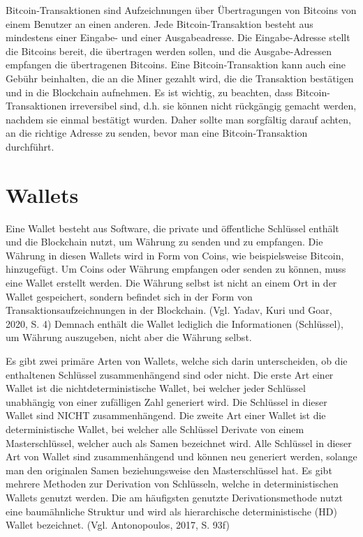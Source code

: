 Bitcoin-Transaktionen sind Aufzeichnungen über Übertragungen von Bitcoins von einem Benutzer an einen anderen. Jede
Bitcoin-Transaktion besteht aus mindestens einer Eingabe- und einer Ausgabeadresse. Die Eingabe-Adresse stellt die Bitcoins
bereit, die übertragen werden sollen, und die Ausgabe-Adressen empfangen die übertragenen Bitcoins. Eine Bitcoin-Transaktion
kann auch eine Gebühr beinhalten, die an die Miner gezahlt wird, die die Transaktion bestätigen und in die Blockchain aufnehmen.
Es ist wichtig, zu beachten, dass Bitcoin-Transaktionen irreversibel sind, d.h. sie können nicht rückgängig gemacht werden,
nachdem sie einmal bestätigt wurden. Daher sollte man sorgfältig darauf achten, an die richtige Adresse zu senden, bevor man eine
Bitcoin-Transaktion durchführt.

\section{Wallets}
Eine Wallet besteht aus Software, die private und öffentliche Schlüssel enthält und die Blockchain nutzt, um Währung zu senden
und zu empfangen. Die Währung in diesen Wallets wird in Form von Coins, wie beispielsweise Bitcoin, hinzugefügt. Um Coins oder
Währung empfangen oder senden zu können, muss eine Wallet erstellt werden. Die Währung selbst ist nicht an einem Ort in der Wallet
gespeichert, sondern befindet sich in der Form von Transaktionsaufzeichnungen in der Blockchain. (Vgl. Yadav, Kuri und Goar,
2020, S. 4) Demnach enthält die Wallet lediglich die Informationen (Schlüssel), um Währung auszugeben, nicht aber die Währung
selbst.

Es gibt zwei primäre Arten von Wallets, welche sich darin unterscheiden, ob die enthaltenen Schlüssel zusammenhängend sind oder
nicht. Die erste Art einer Wallet ist die nichtdeterministische Wallet, bei welcher jeder Schlüssel unabhängig von einer 
zufälligen Zahl generiert wird. Die Schlüssel in dieser Wallet sind NICHT zusammenhängend. Die zweite Art einer Wallet ist die
deterministische Wallet, bei welcher alle Schlüssel Derivate von einem Masterschlüssel, welcher auch als Samen bezeichnet wird.
Alle Schlüssel in dieser Art von Wallet sind zusammenhängend und können neu generiert werden, solange man den originalen Samen
beziehungsweise den Masterschlüssel hat. Es gibt mehrere Methoden zur Derivation von Schlüsseln, welche in deterministischen
Wallets genutzt werden. Die am häufigsten genutzte Derivationsmethode nutzt eine baumähnliche Struktur und wird als 
hierarchische deterministische (HD) Wallet bezeichnet. (Vgl. Antonopoulos, 2017, S. 93f)

